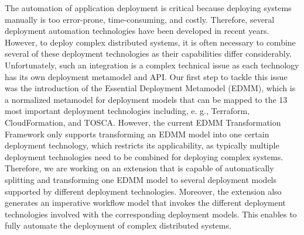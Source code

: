 \documentclass[a4paper,UKenglish]{dagrep-v2018}
\begin{document}

\license

The automation of application deployment is critical because deploying systems manually is too error-prone, time-consuming, and costly. Therefore, several deployment automation technologies have been developed in recent years. However, to deploy complex distributed systems, it is often necessary to combine several of these deployment technologies as their capabilities differ considerably. Unfortunately, such an integration is a complex technical issue as each technology has its own deployment metamodel and API. Our first step to tackle this issue was the introduction of the Essential Deployment Metamodel (EDMM), which is a normalized metamodel for deployment models that can be mapped to the 13 most important deployment technologies including, e. g., Terraform, CloudFormation, and TOSCA. However, the current EDMM Transformation Framework only supports transforming an EDMM model into one certain deployment technology, which restricts its applicability, as typically multiple deployment technologies need to be combined for deploying complex systems. Therefore, we are working on an extension that is capable of automatically splitting and transforming one EDMM model to several  deployment models supported by different deployment technologies. Moreover, the extension also generates an imperative workflow model that invokes the different deployment technologies involved with the corresponding deployment models. This enables to fully automate the deployment of complex distributed systems.


\license
\end{document}
